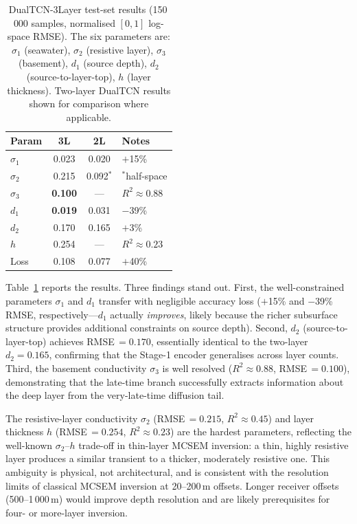 \documentclass[journal]{IEEEtran}
\begin{document}
\begin{table}[t]
  \centering
  \caption{DualTCN-3Layer test-set results (150\,000 samples,
  normalised $[0,1]$ log-space RMSE).  The six parameters are:
  $\sigma_1$ (seawater), $\sigma_2$ (resistive layer),
  $\sigma_3$ (basement), $d_1$ (source depth), $d_2$
  (source-to-layer-top), $h$ (layer thickness).
  Two-layer DualTCN results shown for comparison where applicable.}
  \label{tab:3layer}
  \footnotesize
  \setlength{\tabcolsep}{2pt}
  \begin{tabular}{lccp{1.8cm}}
    \toprule
    Param & 3L & 2L & Notes \\
    \midrule
    $\sigma_1$ & 0.023 & 0.020 & $+$15\% \\
    $\sigma_2$ & 0.215 & 0.092$^*$ & $^*$half-space \\
    $\sigma_3$ & \textbf{0.100} & --- & $R^2{\approx}0.88$ \\
    $d_1$      & \textbf{0.019} & 0.031 & $-$39\% \\
    $d_2$      & 0.170 & 0.165 & $+$3\% \\
    $h$        & 0.254 & --- & $R^2{\approx}0.23$ \\
    \midrule
    Loss       & 0.108 & 0.077 & $+$40\% \\
    \bottomrule
  \end{tabular}
\end{table}

Table~\ref{tab:3layer} reports the results.  Three findings stand out.
First, the well-constrained parameters $\sigma_1$ and $d_1$ transfer
with negligible accuracy loss ($+$15\% and $-$39\% RMSE,
respectively---$d_1$ actually \emph{improves}, likely because the
richer subsurface structure provides additional constraints on source
depth).  Second, $d_2$ (source-to-layer-top) achieves RMSE\,$= 0.170$,
essentially identical to the two-layer $d_2 = 0.165$, confirming that
the Stage-1 encoder generalises across layer counts.  Third, the
basement conductivity $\sigma_3$ is well resolved ($R^2 \approx 0.88$,
RMSE\,$= 0.100$), demonstrating that the late-time branch successfully
extracts information about the deep layer from the very-late-time
diffusion tail.

The resistive-layer conductivity $\sigma_2$ (RMSE\,$= 0.215$,
$R^2 \approx 0.45$) and layer thickness $h$ (RMSE\,$= 0.254$,
$R^2 \approx 0.23$) are the hardest parameters, reflecting the
well-known $\sigma_2$--$h$ trade-off in thin-layer MCSEM inversion:
a thin, highly resistive layer produces a similar transient to a
thicker, moderately resistive one.  This ambiguity is physical, not
architectural, and is consistent with the resolution limits of
classical MCSEM inversion at 20--200\,m offsets.  Longer receiver
offsets (500--1\,000\,m) would improve depth resolution and are
likely prerequisites for four- or more-layer inversion.
\end{document}
